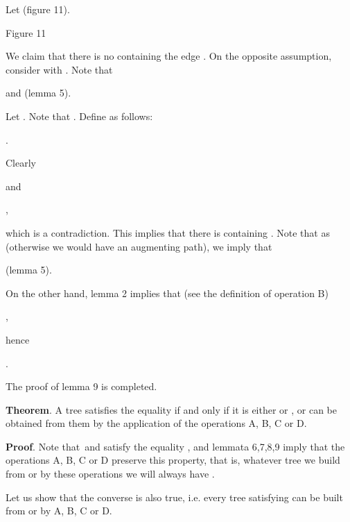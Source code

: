 \documentclass{article}
\begin{document}
Let  (figure 11).

\begin{center}

Figure 11\bigskip
\end{center}

We claim that there is no 
containing the edge . On the opposite assumption, consider  with . Note that

\begin{center}
 and  (lemma 5).
\end{center}

Let . Note that . Define  as
follows:

\begin{center}
.
\end{center}

Clearly

\begin{center}
 and

,
\end{center}

which is a contradiction. This implies that there is   containing . Note that as  (otherwise we
would have an augmenting path), we imply that

\begin{center}
 (lemma 5).
\end{center}

On the other hand, lemma 2 implies that (see the definition of operation B)

\begin{center}
,
\end{center}

hence

\begin{center}
.
\end{center}

The proof of lemma 9 is completed.

\bigskip

\textbf{Theorem}. A tree  satisfies the equality 
if and only if it is either  or , or can be obtained from them
by the application of the operations A, B, C or D.

\textbf{Proof}. Note that\  and  satisfy the equality , and lemmata 6,7,8,9 imply that the operations A, B, C or D
preserve this property, that is, whatever tree  we build from  or  by these operations we will always have .

Let us show that the converse is also true, i.e. every tree  satisfying  can be built from  or  by A, B, C or D.
\end{document}
